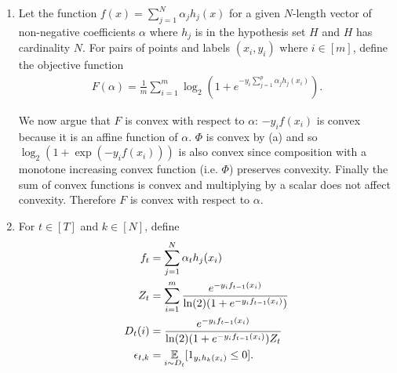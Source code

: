 \begin{enumerate}
\begin{enumerate}
    \item
    Let the function
    $f(x) = \sum_{j=1}^N \alpha_j h_j (x)$
    for a given $N$-length vector of
    non-negative coefficients $\alpha$
    where $h_j$ is in the hypothesis set $H$ and $H$
    has cardinality $N$.
    For pairs of points and labels $(x_i, y_i)$ where $i \in [m]$,
    define the objective function
    \begin{align}
        F(\alpha) = \frac{1}{m} \sum_{i=1}^m
        \log_2(1+e^{-y_i\sum_{j=1}^p\alpha_j h_j (x_i)}).
        \nonumber
    \end{align}

    We now argue that $F$ is convex with respect to $\alpha$:
    $-y_i f(x_i)$ is convex
    because it is an affine function of $\alpha$.
    $\Phi$ is convex by (a) and so
    $\log_2(1+\exp(-y_i f(x_i)))$ is also convex
    since composition with a monotone increasing
    convex function (i.e. $\Phi$) preserves convexity.
    Finally the sum of convex functions is convex and multiplying
    by a scalar does not affect convexity.
    Therefore $F$ is convex with respect to $\alpha$.

    \item
    For $t \in [T]$ and $k \in [N]$, define
    \begin{align}
        f_t &= \sum_{j=1}^N \alpha_t h_j(x_i) \nonumber \\
        Z_t &= \sum_{i=1}^m \frac{e^{-y_i f_{t-1}(x_i)}}
        {\ln(2)(1+e^{-y_i f_{t-1}(x_i)})} \nonumber \\
        D_t(i) &= \frac{e^{-y_i f_{t-1}(x_i)}}
        {\ln(2)(1+e^{-y_i f_{t-1}(x_i)})Z_t} \nonumber \\
        \epsilon_{t,k} &= \operatorname*{\mathbb{E}}_{i \sim D_t}
        [1_{y_i h_k(x_i)} \leq 0].
        \nonumber
    \end{align}


\end{enumerate}
\end{enumerate}

